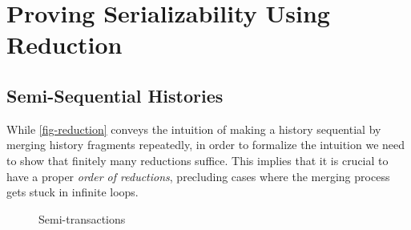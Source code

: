 \documentclass[sigplan,10pt,review,anonymous,screen]{acmart}\settopmatter{printfolios=true,printccs=false,printacmref=false}
\begin{document}




\clearpage
\appendix

\section{Proving Serializability Using Reduction}
\label{sec-appx-proof-sz}

\subsection{Semi-Sequential Histories}
\label{sec-appx-semi-sequential}

While \autoref{fig-reduction} conveys the intuition of making a history sequential by merging history fragments repeatedly, in order to formalize the intuition we need to show that finitely many reductions suffice.
This implies that it is crucial to have a proper \emph{order of reductions}, precluding cases where the merging process gets stuck in infinite loops.

\begin{figure}[h]
  \centering
  \caption{Semi-transactions}
  \label{fig-semi-trs}
\end{figure}
\end{document}

